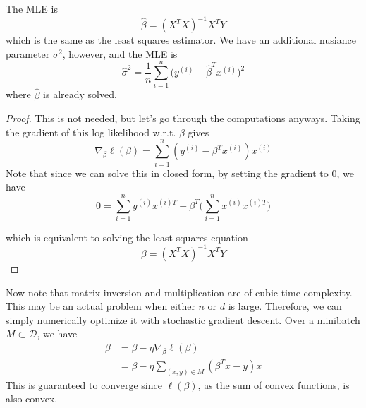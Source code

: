   \begin{corollary}
    \label{thm:mle-is-the-same-as-least-squares-estimator}
    The MLE is 
    \begin{equation}
      \hat{\beta} = (X^T X)^{-1} X^T Y
    \end{equation}
    which is the same as the least squares estimator. We have an additional nusiance parameter $\sigma^2$, however, and the MLE is 
    \begin{equation}
      \hat{\sigma}^2 = \frac{1}{n} \sum_{i=1}^n \big( y^{(i)} - \hat{\beta}^T x^{(i)} \big)^2
    \end{equation}
    where $\hat{\beta}$ is already solved. 
  \end{corollary}
  \begin{proof}
    This is not needed, but let's go through the computations anyways. Taking the gradient of this log likelihood w.r.t. $\beta$ gives 
    \begin{equation}
      \nabla_\beta \ell (\beta) = \sum_{i=1}^n ( y^{(i)} - \beta^T x^{(i)}) x^{(i)}
    \end{equation}
    Note that since we can solve this in closed form, by setting the gradient to $0$, we have 
    \begin{equation}
      0 = \sum_{i=1}^n y^{(i)} x^{(i) T} - \beta^T \bigg( \sum_{i=1}^n x^{(i)} x^{(i) T} \bigg)
    \end{equation}

    which is equivalent to solving the least squares equation 
    \begin{equation}
      \beta = ( X^T X)^{-1} X^T Y
    \end{equation}
  \end{proof}

  Now note that matrix inversion and multiplication are of cubic time complexity. This may be an actual problem when either $n$ or $d$ is large. Therefore, we can simply numerically optimize it with stochastic gradient descent. Over a minibatch $M \subset \mathcal{D}$, we have 
  \begin{align}
    \beta & = \beta - \eta \nabla_\beta \ell (\beta) \\
    & = \beta - \eta \sum_{(x, y) \in M} (\beta^T x - y) x
  \end{align}
  This is guaranteed to converge since $\ell(\beta)$, as the sum of \hyperref[mt-def:convex-function]{convex functions}, is also convex.  

